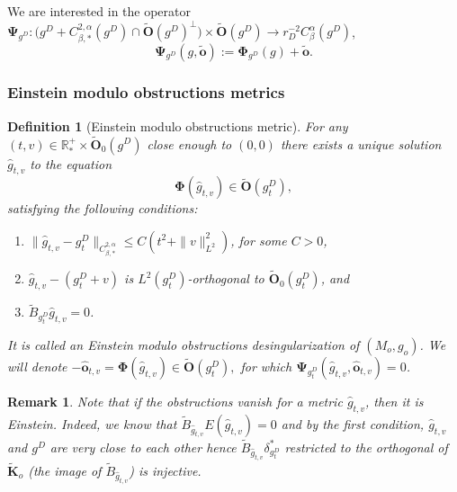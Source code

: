 \documentclass[12pt]{article}
\newtheorem{defn}[thm]{Definition}
\newtheorem{rem}[thm]{Remark}
\begin{document}
    We are interested in the operator $\mathbf{\Psi}_{g^D}: \big(g^D+C^{2,\alpha}_{\beta,*}(g^D)\cap \tilde{\mathbf{O}}(g^D)^\perp\big)\times \tilde{\mathbf{O}}(g^D)\to r_D^{-2}C^\alpha_\beta(g^D)$,
    \begin{equation}
        \mathbf{\Psi}_{g^D}(g,\tilde{\mathbf{o}}):=\mathbf{\Phi}_{g^D}(g) +\tilde{\mathbf{o}}.\label{def Psi gD}
    \end{equation}
    
\subsubsection{Einstein modulo obstructions metrics}
    
    
    \begin{defn}[Einstein modulo obstructions metric]\label{gluing modulo obstructions}
        For any $(t,v)\in \mathbb{R}^+_*\times \tilde{\mathbf{O}}_0(g^D)$ close enough to $(0,0)$ there exists a \emph{unique} solution $\hat{g}_{t,v}$ to the equation 
        $$\mathbf{\Phi}(\hat{g}_{t,v})\in \tilde{\mathbf{O}}(g^D_t),$$
        satisfying the following conditions: 
        \begin{enumerate}
            \item $\|\hat{g}_{t,v}-g^D_t\|_{C^{2,\alpha}_{\beta,*}}\leqslant C (t^2+\|v\|_{L^2}^2)$, for some $C>0$,
            \item $\hat{g}_{t,v}-(g^D_t+v)$ is $L^2(g^D_t)$-orthogonal to $\tilde{\mathbf{O}}_0(g^D_t)$, and
            \item $\tilde{B}_{g^D_t}\hat{g}_{t,v} = 0$.
        \end{enumerate}
        It is called an \emph{Einstein modulo obstructions} desingularization of $(M_o,g_o)$. We will denote  $-\hat{\mathbf{o}}_{t,v}=\mathbf{\Phi}(\hat{g}_{t,v})\in \tilde{\mathbf{O}}(g^D_t),$ for which $ \mathbf{\Psi}_{g^D_t}(\hat{g}_{t,v},\hat{\mathbf{o}}_{t,v})=0  $.
    \end{defn}
    \begin{rem}
        Note that if the obstructions vanish for a metric $\hat{g}_{t,v}$, then it is Einstein. Indeed, we know that $\tilde{B}_{\hat{g}_{t,v}}E(\hat{g}_{t,v})=0$ and by the first condition, $\hat{g}_{t,v}$ and $g^D$ are very close to each other hence $\tilde{B}_{\hat{g}_{t,v}}\delta^*_{g^D_t}$ restricted to the orthogonal of $\tilde{\mathbf{K}}_o$ (the image of $\tilde{B}_{\hat{g}_{t,v}}$) is injective.
    \end{rem}
   
\end{document}
